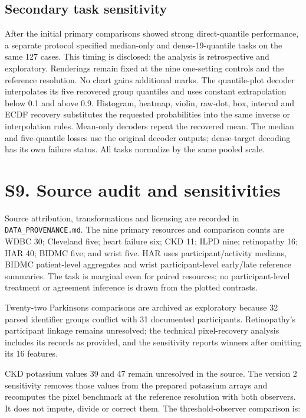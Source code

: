 \documentclass[10pt]{article}
\begin{document}
\subsection*{Secondary task sensitivity}
After the initial primary comparisons showed strong direct-quantile performance, a separate protocol specified median-only and dense-19-quantile tasks on the same 127 cases. This timing is disclosed: the analysis is retrospective and exploratory. Renderings remain fixed at the nine one-setting controls and the reference resolution. No chart gains additional marks. The quantile-plot decoder interpolates its five recovered group quantiles and uses constant extrapolation below 0.1 and above 0.9. Histogram, heatmap, violin, raw-dot, box, interval and ECDF recovery substitutes the requested probabilities into the same inverse or interpolation rules. Mean-only decoders repeat the recovered mean. The median and five-quantile losses use the original decoder outputs; dense-target decoding has its own failure status. All tasks normalize by the same pooled scale.



\section*{S9. Source audit and sensitivities}
Source attribution, transformations and licensing are recorded in \texttt{DATA\_PROVENANCE.md}. The nine primary resources and comparison counts are WDBC 30; Cleveland five; heart failure six; CKD 11; ILPD nine; retinopathy 16; HAR 40; BIDMC five; and wrist five.\cite{wdbc,heart,failure,kidney,liver,retina,har,bidmc,wrist} HAR uses participant/activity medians, BIDMC patient-level aggregates and wrist participant-level early/late reference summaries.\cite{pimentel2017,jarchi2017} The task is marginal even for paired resources; no participant-level treatment or agreement inference is drawn from the plotted contrasts.

Twenty-two Parkinsons comparisons are archived as exploratory because 32 parsed identifier groups conflict with 31 documented participants.\cite{parkinsons} Retinopathy's participant linkage remains unresolved; the technical pixel-recovery analysis includes its records as provided, and the sensitivity reports winners after omitting its 16 features.

CKD potassium values 39 and 47 remain unresolved in the source. The version 2 sensitivity removes those values from the prepared potassium arrays and recomputes the pixel benchmark at the reference resolution with both observers. It does not impute, divide or correct them. The threshold-observer comparison is:
\end{document}
